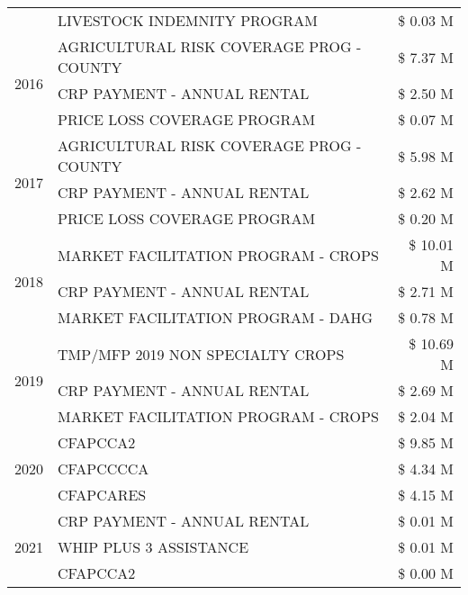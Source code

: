 \begin{tabular}{llr}
 & LIVESTOCK INDEMNITY PROGRAM & \$ 0.03 M \\
\cline{1-3}
\multirow[t]{3}{*}{2016} & AGRICULTURAL RISK COVERAGE PROG - COUNTY      & \$ 7.37 M \\
 & CRP PAYMENT - ANNUAL RENTAL                   & \$ 2.50 M \\
 & PRICE LOSS COVERAGE PROGRAM                   & \$ 0.07 M \\
\cline{1-3}
\multirow[t]{3}{*}{2017} & AGRICULTURAL RISK COVERAGE PROG - COUNTY & \$ 5.98 M \\
 & CRP PAYMENT - ANNUAL RENTAL & \$ 2.62 M \\
 & PRICE LOSS COVERAGE PROGRAM & \$ 0.20 M \\
\cline{1-3}
\multirow[t]{3}{*}{2018} & MARKET FACILITATION PROGRAM - CROPS & \$ 10.01 M \\
 & CRP PAYMENT - ANNUAL RENTAL & \$ 2.71 M \\
 & MARKET FACILITATION PROGRAM - DAHG & \$ 0.78 M \\
\cline{1-3}
\multirow[t]{3}{*}{2019} & TMP/MFP 2019 NON SPECIALTY CROPS & \$ 10.69 M \\
 & CRP PAYMENT - ANNUAL RENTAL & \$ 2.69 M \\
 & MARKET FACILITATION PROGRAM - CROPS & \$ 2.04 M \\
\cline{1-3}
\multirow[t]{3}{*}{2020} & CFAPCCA2 & \$ 9.85 M \\
 & CFAPCCCCA & \$ 4.34 M \\
 & CFAPCARES & \$ 4.15 M \\
\cline{1-3}
\multirow[t]{3}{*}{2021} & CRP PAYMENT - ANNUAL RENTAL & \$ 0.01 M \\
 & WHIP PLUS 3 ASSISTANCE & \$ 0.01 M \\
 & CFAPCCA2 & \$ 0.00 M \\
\cline{1-3}
\bottomrule
\end{tabular}
